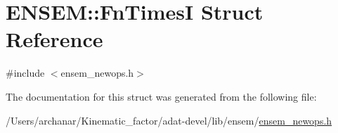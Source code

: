 \hypertarget{structENSEM_1_1FnTimesI}{}\section{E\+N\+S\+EM\+:\+:Fn\+TimesI Struct Reference}
\label{structENSEM_1_1FnTimesI}


{\ttfamily \#include $<$ensem\+\_\+newops.\+h$>$}



The documentation for this struct was generated from the following file\+:\begin{DoxyCompactItemize}
\item 
/\+Users/archanar/\+Kinematic\+\_\+factor/adat-\/devel/lib/ensem/\mbox{\hyperlink{adat-devel_2lib_2ensem_2ensem__newops_8h}{ensem\+\_\+newops.\+h}}\end{DoxyCompactItemize}
